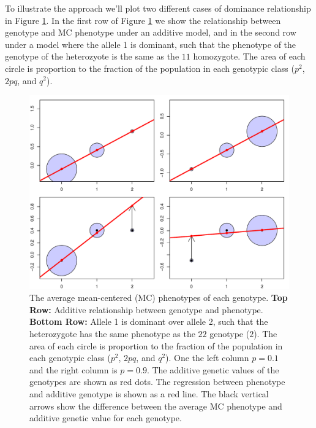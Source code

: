 To illustrate the approach we'll plot two different cases of dominance
relationship in Figure \ref{fig:add_dom}. In the first row of Figure
\ref{fig:add_dom} we show the relationship between genotype and MC phenotype
under an additive model, and in the second row under a model where the allele 1
is dominant, such that the phenotype of the genotype of the heterozyote is the
same as the $11$ homozygote. The area of each circle is proportion to the
fraction of the population in each genotypic class ($p^2$, $2pq$, and $q^2$). 

\begin{figure}
\begin{center}
\includegraphics[width=\textwidth]{figures/additive_effect.pdf}
\end{center}
\caption{The average mean-centered (MC) phenotypes of each genotype. 
{\bf Top Row:} Additive relationship between genotype and phenotype. 
{\bf Bottom Row:} Allele 1 is dominant over allele 2, such that the
heterozygote has the same phenotype as the $22$ genotype ($2$). 
The area of each circle is proportion to the fraction of
the population in each genotypic class ($p^2$, $2pq$, and $q^2$). 
One the left column $p=0.1$ and the right column is $p=0.9$.
The additive genetic values of the genotypes are shown as
  red dots. The regression between phenotype and additive genotype is
  shown as a red line. The black vertical arrows show the difference
between the average MC phenotype and additive genetic value for each genotype. } \label{fig:add_dom}
\end{figure}

